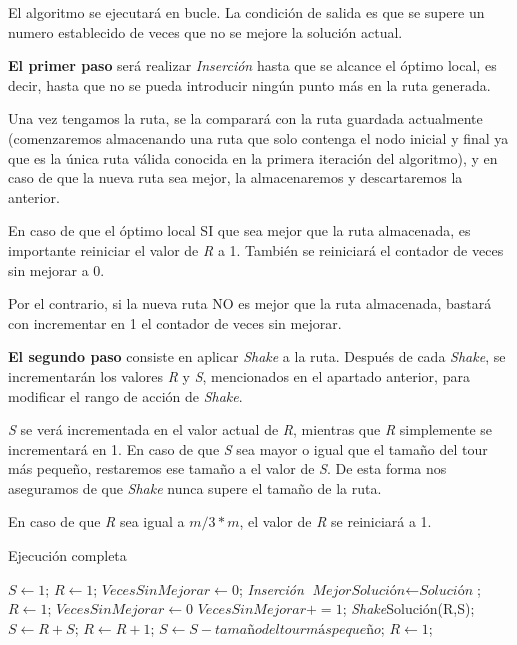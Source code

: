 El algoritmo se ejecutará en bucle. La condición de salida es que se supere un numero establecido de veces que no se mejore la solución actual.

\textbf{El primer paso} será realizar \textit{Inserción} hasta que se alcance el óptimo local, es decir, hasta que no se pueda introducir ningún punto más en la ruta generada.

Una vez tengamos la ruta, se la comparará con la ruta guardada actualmente (comenzaremos almacenando una ruta que solo contenga el nodo inicial y final ya que es la única ruta válida conocida en la primera iteración del algoritmo), y en caso de que la nueva ruta sea mejor, la almacenaremos y descartaremos la anterior.

En caso de que el óptimo local SI que sea mejor que la ruta almacenada, es importante reiniciar el valor de \textit{R} a 1. También se reiniciará el contador de veces sin mejorar a 0.

Por el contrario, si la nueva ruta NO es mejor que la ruta almacenada, bastará con incrementar en 1 el contador de veces sin mejorar.

\textbf{El segundo paso} consiste en aplicar \textit{Shake} a la ruta. Después de cada \textit{Shake}, se incrementarán los valores \textit{R} y \textit{S}, mencionados en el apartado anterior, para modificar el rango de acción de \textit{Shake}. 

\textit{S} se verá incrementada en el valor actual de \textit{R}, mientras que \textit{R} simplemente se incrementará en 1.
En caso de que \textit{S} sea mayor o igual que el tamaño del tour más pequeño, restaremos ese tamaño a el valor de \textit{S}. De esta forma nos aseguramos de que \textit{Shake} nunca supere el tamaño de la ruta.

En caso de que \textit{R} sea igual a $m/3*m$, el valor de \textit{R} se reiniciará a 1.

\begin{algorithm}
\caption{Ejecución completa}
\begin{algorithmic}
\STATE $S \leftarrow 1$;
\STATE $R \leftarrow 1$;
\STATE $\textit{VecesSinMejorar} \leftarrow 0$;
\STATE \textit{Inserción}
\ENDWHILE
{}
\STATE $\textit{MejorSolución} \leftarrow \textit{Solución}$;
\STATE $R \leftarrow  1$;
\STATE $\textit{VecesSinMejorar} \leftarrow 0$
\ELSE
\STATE $\textit{VecesSinMejorar} += 1$;
\ENDIF
\STATE \textit{Shake}Solución(R,S);
\STATE $S \leftarrow R + S$;
\STATE $R \leftarrow R +1$;
\STATE $S \leftarrow S - tamaño del tour más pequeño$;
\ENDIF
{}
\STATE $R \leftarrow 1$;
\ENDIF
\ENDWHILE
\end{algorithmic}
\end{algorithm}


